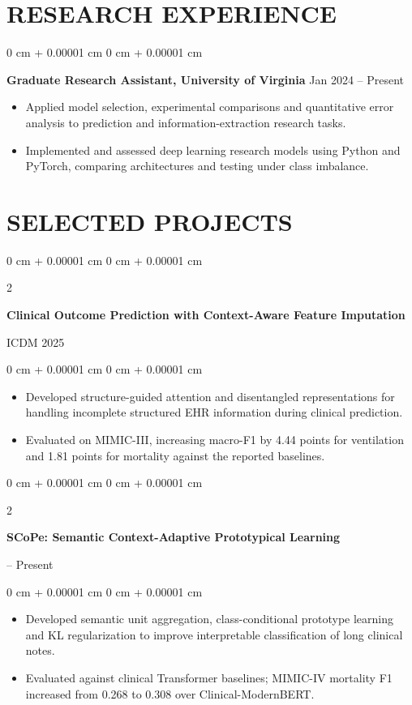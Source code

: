 \documentclass[10pt, letterpaper]{article}
\newenvironment{highlights}{
    \begin{itemize}[
        topsep=0.03 cm,
        parsep=0.03 cm,
        partopsep=0pt,
        itemsep=0pt,
        leftmargin=0 cm + 10pt
    ]
}{
    \end{itemize}
} %
\newenvironment{onecolentry}{
    \begin{adjustwidth}{
        0 cm + 0.00001 cm
    }{
        0 cm + 0.00001 cm
    }
}{
    \end{adjustwidth}
} %
\newenvironment{twocolentry}[2][]{
    \onecolentry
    \def\secondColumn{#2}
    \setcolumnwidth{\fill, 4.5 cm}
    \begin{paracol}{2}
}{
    \switchcolumn \raggedleft \secondColumn
    \end{paracol}
    \endonecolentry
} %
\begin{document}
\section{RESEARCH EXPERIENCE}
\begin{onecolentry}
\textbf{Graduate Research Assistant, University of Virginia} \hfill Jan 2024 -- Present
\begin{highlights}
\item Applied model selection, experimental comparisons and quantitative error analysis to prediction and information-extraction research tasks.
\item Implemented and assessed deep learning research models using Python and PyTorch, comparing architectures and testing under class imbalance.
\end{highlights}
\end{onecolentry}
\section{SELECTED PROJECTS}
\begin{twocolentry}{ICDM 2025}
\textbf{Clinical Outcome Prediction with Context-Aware Feature Imputation}
\end{twocolentry}
\begin{onecolentry}
\begin{highlights}
\item Developed structure-guided attention and disentangled representations for handling incomplete structured EHR information during clinical prediction.
\item Evaluated on MIMIC-III, increasing macro-F1 by 4.44 points for ventilation and 1.81 points for mortality against the reported baselines.
\end{highlights}
\end{onecolentry}
\vspace{0.035 cm}

\begin{twocolentry}{2026 -- Present}
\textbf{SCoPe: Semantic Context-Adaptive Prototypical Learning}
\end{twocolentry}
\begin{onecolentry}
\begin{highlights}
\item Developed semantic unit aggregation, class-conditional prototype learning and KL regularization to improve interpretable classification of long clinical notes.
\item Evaluated against clinical Transformer baselines; MIMIC-IV mortality F1 increased from 0.268 to 0.308 over Clinical-ModernBERT.
\end{highlights}
\end{onecolentry}
\vspace{0.035 cm}
\end{document}
